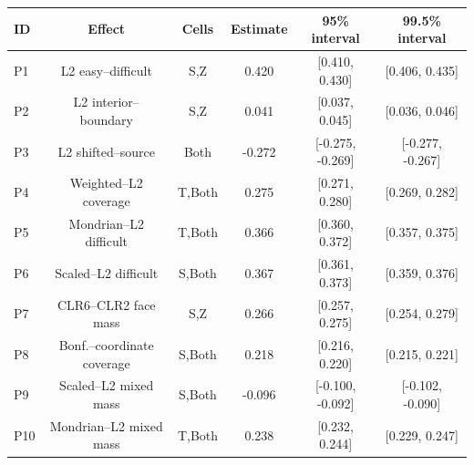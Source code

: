 \begin{tabular}{lccccc}
\toprule
ID & Effect & Cells & Estimate & 95\% interval & 99.5\% interval \\
\midrule
P1 & L2 easy--difficult & S,Z & 0.420 & [0.410, 0.430] & [0.406, 0.435] \\
P2 & L2 interior--boundary & S,Z & 0.041 & [0.037, 0.045] & [0.036, 0.046] \\
P3 & L2 shifted--source & Both & -0.272 & [-0.275, -0.269] & [-0.277, -0.267] \\
P4 & Weighted--L2 coverage & T,Both & 0.275 & [0.271, 0.280] & [0.269, 0.282] \\
P5 & Mondrian--L2 difficult & T,Both & 0.366 & [0.360, 0.372] & [0.357, 0.375] \\
P6 & Scaled--L2 difficult & S,Both & 0.367 & [0.361, 0.373] & [0.359, 0.376] \\
P7 & CLR6--CLR2 face mass & S,Z & 0.266 & [0.257, 0.275] & [0.254, 0.279] \\
P8 & Bonf.--coordinate coverage & S,Both & 0.218 & [0.216, 0.220] & [0.215, 0.221] \\
P9 & Scaled--L2 mixed mass & S,Both & -0.096 & [-0.100, -0.092] & [-0.102, -0.090] \\
P10 & Mondrian--L2 mixed mass & T,Both & 0.238 & [0.232, 0.244] & [0.229, 0.247] \\
\bottomrule
\end{tabular}
